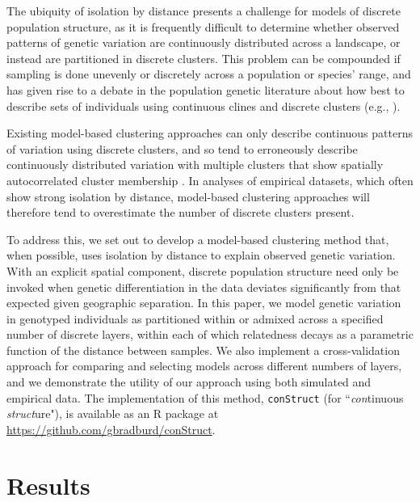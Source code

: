 \documentclass[10pt,letterpaper]{article}
\begin{document}
The ubiquity of isolation by distance presents a challenge for models of discrete population structure,
as it is frequently difficult to determine whether observed patterns of genetic variation are 
continuously distributed across a landscape, or instead are partitioned in discrete clusters.
This problem can be compounded if sampling is done unevenly or discretely across a population or species' range,
and has given rise to a debate in the population genetic literature
about how best to describe sets of individuals using continuous clines and discrete clusters 
(e.g., \cite{SerrePaabo2004,rosenberg2005clines}).

Existing model-based clustering approaches can only describe continuous patterns of variation using
discrete clusters, and so tend to erroneously describe continuously distributed variation with multiple clusters that 
show spatially autocorrelated cluster membership \cite{Frantz2009,meirmans2012}.
In analyses of empirical datasets, which often show strong isolation by distance,
model-based clustering approaches will therefore tend to overestimate
the number of discrete clusters present. 

To address this, we set out to develop
a model-based clustering method that, when possible, uses isolation by distance 
to explain observed genetic variation.
With an explicit spatial component, discrete population structure need only be invoked when genetic differentiation 
in the data deviates significantly from that expected given geographic separation.
In this paper, 
we model genetic variation in genotyped individuals as 
partitioned within or admixed across a specified number of discrete layers,
within each of which relatedness decays as a parametric function of the distance between samples.
We also implement a cross-validation approach for comparing and selecting models across different numbers of layers,
and we demonstrate the utility of our approach using both simulated and empirical data.
The implementation of this method, \texttt{conStruct} (for ``\emph{con}tinuous \emph{struct}ure"), 
is available as an R package at 
\href{https://github.com/gbradburd/conStruct}{https://github.com/gbradburd/conStruct}.

\section*{Results}
\end{document}
